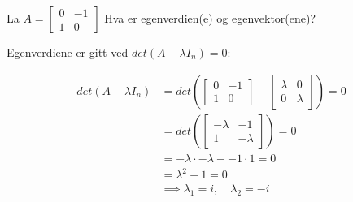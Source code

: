 \documentclass[11pt, a4paper, norsk]{article}
\begin{document}
        \begin{Example}{}{}
            La $A = \begin{bmatrix}
                0 & -1 \\
                1 & 0
            \end{bmatrix}$ Hva er egenverdien(e) og egenvektor(ene)?

            Egenverdiene er gitt ved $det(A - \lambda I_{n}) = 0$:

            \begin{align*}
                det(A - \lambda I_{n}) &= det \left(\begin{bmatrix}
                    0 & -1 \\
                    1 & 0
                \end{bmatrix} - \begin{bmatrix}
                    \lambda & 0 \\
                    0 & \lambda
            \end{bmatrix} \right) = 0
            \\
                                       &= det\left(\begin{bmatrix}
                                               -\lambda & -1 \\
                                               1 & -\lambda
                                       \end{bmatrix} \right)= 0
                                       \\
                                       &= -\lambda \cdot -\lambda - -1 \cdot 1 = 0
                                       \\
                                       &= \lambda^2 + 1 = 0
                                       \\
                                       &\implies \lambda_{1} = i, \quad \lambda_{2} = -i
            \end{align*}


\end{Example}
\end{document}
